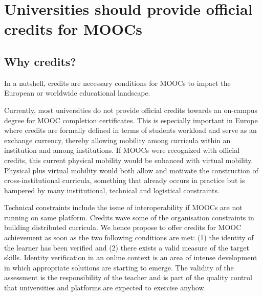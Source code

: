 \section{Universities should provide official credits for MOOCs}
\label{sec:credit}
 

\subsection{Why credits?}

In a nutshell, credits are necessary conditions for MOOCs to impact the European or
worldwide educational landscape. 

Currently, most universities do not provide official credits towards an
on-campus degree for MOOC
completion certificates.
This is especially important in Europe where
credits are formally defined in terms of students workload and serve as
an exchange currency, thereby allowing mobility among curricula within an
institution and among institutions. If MOOCs were recognized with official
credits, this current physical mobility would be enhanced with 
virtual mobility.  Physical plus virtual mobility would both allow and motivate
the construction of cross-institutional curricula, something that
already occurs in practice but is hampered by
many institutional, technical and logistical constraints. 


Technical constraints include the issue of interoperability if MOOCs are not
running on same platform. Credits wave some of the organisation constraints
in building distributed curricula.  We hence propose to offer  credits for 
MOOC achievement as soon as the two following conditions are met: (1) the identity of the
learner has been verified and (2) there exists a valid
measure of the target skills. Identity verification in an online context
is an area of intense development in which appropriate solutions are
starting to emerge. The validity of the assessment is the responsibility of
the teacher and is part of the quality control that universities and
platforms are expected to exercise anyhow.

